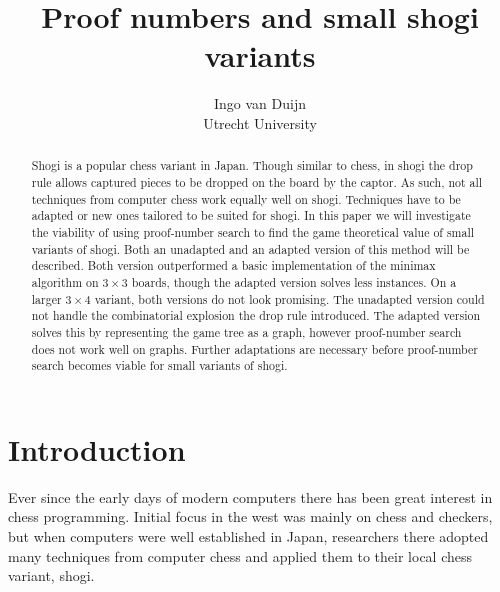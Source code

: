 \documentclass[a4paper, 11pt]{article}
\title{Proof numbers and small shogi variants}
\author{Ingo van Duijn \\ Utrecht University}
\date{}
\begin{document}
\maketitle

\begin{abstract}
Shogi is a popular chess variant in Japan. Though similar to chess, in shogi the drop rule allows captured pieces to be dropped on the board by the captor.
As such, not all techniques from computer chess work equally well on shogi. Techniques have to be adapted or new ones tailored
to be suited for shogi. In this paper we will investigate the viability of using proof-number search to find the game theoretical value of
small variants of shogi. Both an unadapted and an adapted version of this method will be described. Both version outperformed a basic implementation
of the minimax algorithm on $3 \times 3$ boards, though the adapted version solves less instances. On a larger $3 \times 4$ variant, both versions
do not look promising. The unadapted version could not handle the combinatorial explosion the drop rule introduced. The adapted version solves this
by representing the game tree as a graph, however proof-number search does not work well on graphs. Further adaptations are necessary before
proof-number search becomes viable for small variants of shogi.
\end{abstract}

\section{Introduction}
Ever since the early days of modern computers there has been great interest in chess programming. Initial
focus in the west was mainly on chess and checkers, but when computers were well established in Japan, researchers there adopted
many techniques from computer chess and applied them to their local chess variant, shogi.
\end{document}
